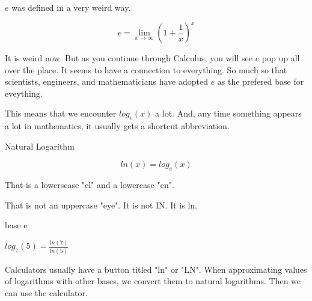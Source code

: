 \documentclass{ximera}
\begin{document}
$e$ was defined in a very weird way.

\[   e = \lim_{x \to \infty}  \left(1 + \frac{1}{x}\right)^x      \]


It is weird now.  But as you continue through Calculus, you will see $e$ pop up all over the place.  It seems to have a connection to everything.  So much so that scientists, engineers, and mathematicians have  adopted $e$ as the prefered base for eveything.


This means that we encounter $log_e(x)$ a lot.  And, any time something appears a lot in mathematics, it usually gets a shortcut abbreviation.




\begin{definition}  Natural Logarithm


\[     ln(x) = log_e(x) \]


That is a lowerscase "el" and a lowercase "en".


\end{definition}


That is not an uppercase "eye".  It is not IN.  It is ln.





\begin{example}  base e


$log_7(5) = \frac{ln(7)}{ln(5)}$


\end{example}



Calculators usually have a button titled "ln" or "LN".  When approximating values of logarithms with other bases, we convert them to natural logarithms.  Then we can use the calculator.
\end{document}
